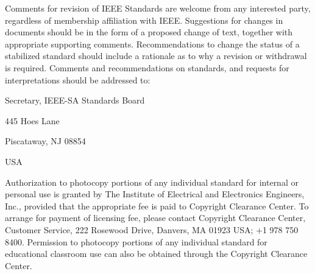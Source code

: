 \begin{minipage}[t]{396pt}
                             \vspace{7.5pt}
                             Comments for revision of IEEE Standards are welcome from any interested party, regardless of membership\linebreak
                             affiliation with IEEE. Suggestions for changes in documents should be in the form of a proposed change of text,\linebreak
                             together with appropriate supporting comments. Recommendations to change the status of a stabilized standard\linebreak
                             should include a rationale as to why a revision or withdrawal is required. Comments and recommendations on\linebreak
                             standards, and requests for interpretations should be addressed to:\par

                             \vspace{19.5pt}
                             \hspace*{100pt}\begin{minipage}{180pt}
                                                Secretary, IEEE-SA Standards Board\par
                                                445 Hoes Lane\par
                                                Piscataway, NJ 08854\par
                                                USA
                             \end{minipage}\par

                             \vspace{10.7pt}
                             Authorization to photocopy portions of any individual standard for internal or personal use is granted by The\linebreak
                             Institute of Electrical and Electronics Engineers, Inc., provided that the appropriate fee is paid to Copyright\linebreak
                             Clearance Center. To arrange for payment of licensing fee, please contact Copyright Clearance Center, Customer\linebreak
                             Service, 222 Rosewood Drive, Danvers, MA 01923 USA; +1 978 750 8400. Permission to photocopy portions of\linebreak
                             any individual standard for educational classroom use can also be obtained through the Copyright Clearance Center.
\end{minipage}
\endgroup
\clearpage
